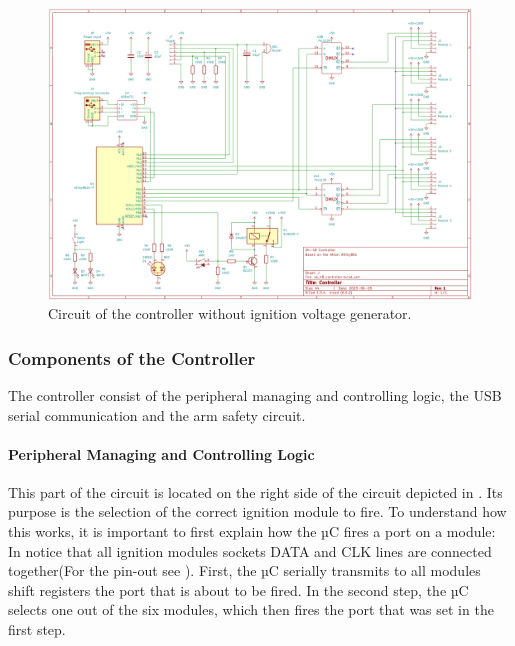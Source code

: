 \begin{figure}[!ht]
    \centering
    \includegraphics[width=15cm]{./Figures/controller_circuit.png}
    \caption{Circuit of the controller without ignition voltage generator.}
    \label{fig:controller_circuit}     
\end{figure}

\pagebreak

\subsubsection{Components of the Controller}
\label{Components of the Controller}
The controller consist of the peripheral managing and controlling logic, the USB serial communication and the arm safety circuit. 

\paragraph{Peripheral Managing and Controlling Logic}
This part of the circuit is located on the right side of the circuit depicted in . Its purpose is the selection of the correct ignition module to fire. To understand how this works, it is important to first explain how the µC fires a port on a module: In  notice that all ignition modules sockets DATA and CLK lines are connected together(For the pin-out see ). First, the µC serially transmits to all modules shift registers the port that is about to be fired. In the second step, the µC selects one out of the six modules, which then fires the port that was set in the first step.\\

